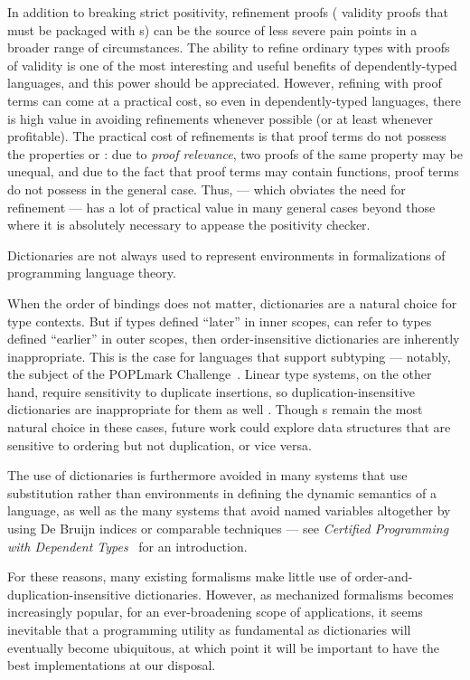 In addition to breaking strict positivity, refinement proofs (\eg{} validity proofs that must be packaged with \cal{}s) can be the source of less severe pain points in
a broader range of circumstances.
The ability to refine ordinary types with proofs of validity is one of the most interesting and useful benefits of
dependently-typed languages, and this power should be appreciated. However, refining with proof terms can
come at a practical cost, so even in dependently-typed languages, there is high value in avoiding refinements
whenever possible (or at least whenever profitable). The practical cost of refinements is that proof terms
do not possess the properties \SemInj{} or \EqDec: due to \emph{proof relevance}, two proofs of
the same property may be unequal, and due to the fact that proof terms may contain functions, proof terms do not
possess \EqDec{} in the general case. Thus, \SemTot{} --- which obviates the need for refinement --- has
a lot of practical value in many general cases beyond those where it is absolutely necessary to appease the
positivity checker.


Dictionaries are not always used to represent environments in formalizations of programming language theory.

When the order of bindings does not matter, dictionaries are a natural choice for type contexts.
%
But if types defined ``later'' in inner scopes, can refer to types defined ``earlier'' in outer scopes, then order-insensitive dictionaries are inherently inappropriate.
%
This is the case for languages that support subtyping --- notably, the subject of the POPLmark Challenge~\citep{POPLmark}.
%
Linear type systems, on the other hand, require sensitivity to duplicate insertions, so duplication-insensitive dictionaries are inappropriate for them as well \citep{StructProp}.
%
Though {\sal}s remain the most natural choice in these cases, future work could explore data structures that are sensitive to ordering but not duplication, or vice versa.

The use of dictionaries is furthermore avoided in many systems that use substitution rather than environments
%
in defining the dynamic semantics of a language, as well as the many systems that avoid named variables altogether by using De Bruijn indices or comparable techniques --- see \emph{Certified Programming with Dependent Types}~\cite[Library Firstorder]{cpdt} for an introduction.

For these reasons, many existing formalisms make little use of order-and-duplication-insensitive dictionaries. 
%
However, as mechanized formalisms becomes increasingly popular, for an ever-broadening scope of applications,
%
it seems inevitable that a programming utility as fundamental as dictionaries will eventually become ubiquitous, at which point it will be important to have the
%
best implementations at our disposal.

